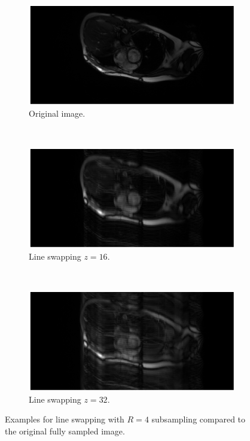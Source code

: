 \begin{figure}[h] %
	\centering
	\begin{subfigure}{0.8\textwidth}
    		\includegraphics[width=\textwidth]{./Images/LineSwappingOriginal.png}
    		\caption{Original image.}
    		\label{fig:LineSwappingOriginal}
	\end{subfigure}
	\\
	\begin{subfigure}{0.8\textwidth}
    		\includegraphics[width=\textwidth]{./Images/LineSwapping16.png}
    		\caption{Line swapping $z=16$.}
    		\label{fig:LineSwapping16}
	\end{subfigure}
	\\
	\begin{subfigure}{0.8\textwidth}
    		\includegraphics[width=\textwidth]{./Images/LineSwapping32.png}
    		\caption{Line swapping $z=32$.}
    		\label{fig:LineSwapping32}
	\end{subfigure}
	\caption{Examples for line swapping with $R=4$ subsampling compared to the original fully sampled image.}
	\label{fig:LineSwapping}
\end{figure}

